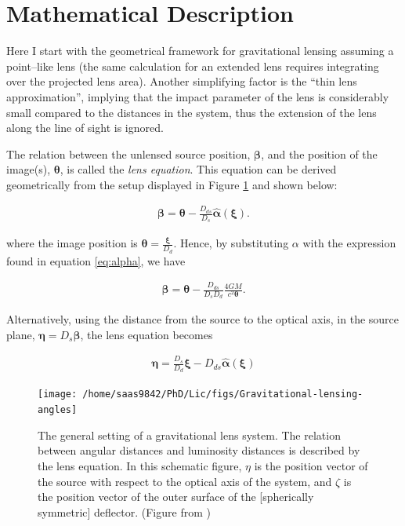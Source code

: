 \documentclass[a4wide,12pt]{book}
\begin{document}
\section{Mathematical Description}
Here I start with the geometrical framework for gravitational lensing assuming a point--like lens (the same calculation for an extended lens requires integrating over the projected lens area). Another simplifying factor is the ``thin lens approximation'', implying that the impact parameter of the lens is considerably small compared to the distances in the system, thus the extension of the lens along the line of sight is ignored.

The relation between the unlensed source position, $\boldsymbol \beta$, and the position of the image(s), $\boldsymbol \theta$, is called the \emph{lens equation}. This equation can be derived geometrically from the setup displayed in Figure \ref{fig:config} and shown below:

\begin{eqnarray}
\label{eq:lens_eq_angle}
\boldsymbol \beta = \boldsymbol \theta - \frac{D_{ds}}{D_s} \hat{\boldsymbol \alpha}(\boldsymbol \xi).
\end{eqnarray}

 where the image position is $\boldsymbol \theta = \frac{\boldsymbol \xi}{D_{d}}$. Hence, by substituting $\alpha$ with the expression found in equation \ref{eq:alpha}, we have

\begin{eqnarray}
\label{eq:lens_equation}
\boldsymbol \beta = \boldsymbol \theta - \frac{D_{ds}}{D_s D_d} \frac{4GM}{c^2 \boldsymbol \theta}.
\end{eqnarray}

 Alternatively, using the distance from the source to the optical axis, in the source plane,  $\boldsymbol \eta = D_{s} \boldsymbol \beta$, the lens equation becomes

\begin{eqnarray}
\label{eq:lens_eq_distance}
\boldsymbol \eta = \frac{D_s}{D_d}\boldsymbol \xi - D_{ds}\hat{\boldsymbol \alpha}(\boldsymbol \xi)
\end{eqnarray}

\begin{figure}
\centering
\texttt{[image: /home/saas9842/PhD/Lic/figs/Gravitational-lensing-angles]}
\caption{The general setting of a gravitational lens system. The relation between angular distances and luminosity distances is described by the lens equation. In this schematic figure, $\eta$ is the position vector of the source with respect to the optical axis of the system, and $\zeta$ is the position vector of the outer surface of the [spherically symmetric] deflector. (Figure from \citealt[][]{GLbook})}
\label{fig:config}
\end{figure}
\end{document}
